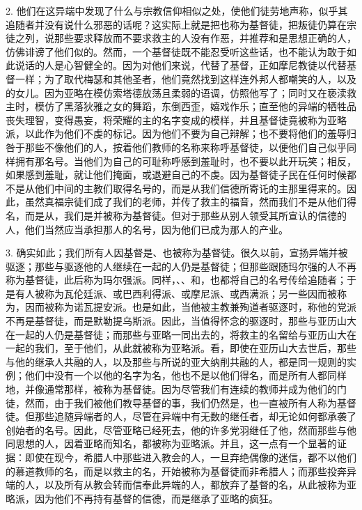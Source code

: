 2. 他们在这异端中发现了什么与宗教信仰相似之处，使他们徒劳地声称，似乎其追随者并没有说什么邪恶的话呢？这实际上就是把也称为基督徒，把叛徒仍算在宗徒之列，说那些要求释放而不要求救主的人没有作恶，并推荐和是思想正确的人，仿佛诽谤了他们似的。然而，一个基督徒既不能忍受听这些话，也不能认为敢于如此说话的人是心智健全的。因为对他们来说，代替了基督，正如摩尼教徒以代替基督一样；为了取代梅瑟和其他圣者，他们竟然找到这样连外邦人都嘲笑的人，以及的女儿。因为亚略在模仿索塔德放荡且柔弱的语调，仿照他写了；同时又在亵渎救主时，模仿了黑落狄雅之女的舞蹈，东倒西歪，嬉戏作乐；直至他的异端的牺牲品丧失理智，变得愚妄，将荣耀的主的名字变成的模样，并且基督徒竟被称为亚略派，以此作为他们不虔的标记。因为他们不要为自己辩解；也不要将他们的羞辱归咎于那些不像他们的人，按着他们教师的名称来称呼基督徒，以便他们自己似乎同样拥有那名号。当他们为自己的可耻称呼感到羞耻时，也不要以此开玩笑；相反，如果感到羞耻，就让他们掩面，或退避自己的不虔。因为基督徒子民在任何时候都不是从他们中间的主教们取得名号的，而是从我们信德所寄讬的主那里得来的。因此，虽然真福宗徒们成了我们的老师，并传了救主的福音，然而我们不是从他们得名，而是从，我们是并被称为基督徒。但对于那些从别人领受其所宣认的信德的人，他们当然应当承担那人的名号，因为他们已成为那人的产业。\par

3. 确实如此；我们所有人因基督是、也被称为基督徒。很久以前，宣扬异端并被驱逐；那些与驱逐他的人继续在一起的人仍是基督徒；但那些跟随玛尔强的人不再称为基督徒，此后称为玛尔强派。同样，、、和，也都将自己的名号传给追随者；于是有人被称为瓦伦廷派、或巴西利得派、或摩尼派、或西满派；另一些因而被称为，因而被称为诺瓦提安派。也是如此，当他被主教兼殉道者驱逐时，称他的党派不再是基督徒，而是默勒提乌斯派。因此，当值得怀念的驱逐时，那些与亚历山大在一起的人仍是基督徒；而那些与亚略一同出去的，将救主的名留给与亚历山大在一起的我们，至于他们，从此就被称为亚略派。看，即使在亚历山大去世后，那些与他的继承人共融的人，以及那些与所说的亚大纳削共融的人，都是同一规则的实例；他们中没有一个以他的名字为名，他也不是以他们得名，而是所有人都同样地，并像通常那样，被称为基督徒。因为尽管我们有连续的教师并成为他们的门徒，然而，由于我们被他们教导基督的事，我们仍然是，也一直被所有人称为基督徒。但那些追随异端者的人，尽管在异端中有无数的继任者，却无论如何都承袭了创始者的名号。因此，尽管亚略已经死去，他的许多党羽继任了他，然而那些与他同思想的人，因着亚略而知名，都被称为亚略派。并且，这一点有一个显著的证据：即使在现今，希腊人中那些进入教会的人，一旦弃绝偶像的迷信，都不以他们的慕道教师的名，而是以救主的名，开始被称为基督徒而非希腊人；而那些投奔异端的人，以及所有从教会转而信奉此异端的人，都放弃了基督的名，从此被称为亚略派，因为他们不再持有基督的信德，而是继承了亚略的疯狂。\par

